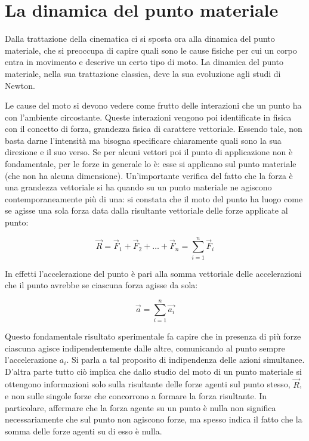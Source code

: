 \chapter{La dinamica del punto materiale}

Dalla trattazione della cinematica ci si sposta ora alla dinamica del punto materiale, che si preoccupa di capire quali sono le cause fisiche per cui un corpo entra in movimento e descrive un certo tipo di moto. La dinamica del punto materiale, nella sua trattazione classica, deve la sua evoluzione agli studi di Newton.

Le cause del moto si devono vedere come frutto delle interazioni che un punto ha con l'ambiente circostante. Queste interazioni vengono poi identificate in fisica con il concetto di forza, grandezza fisica di carattere vettoriale. Essendo tale, non basta darne l'intensità ma bisogna specificare chiaramente quali sono la sua direzione e il suo verso.  Se per alcuni vettori poi il punto di applicazione non è fondamentale,  per le forze in generale lo è: esse si applicano sul punto materiale (che non ha alcuna dimensione).
Un'importante verifica del fatto che la forza è una grandezza vettoriale si ha quando su un punto materiale ne agiscono contemporaneamente più di una: si constata che il moto del punto ha luogo come se agisse una sola forza data dalla risultante vettoriale delle forze applicate al punto:

\[
	\vec{R}=\vec{F}_1+\vec{F}_2+\dots+\vec{F}_n=\sum_{i=1}^n \vec{F}_i
\]

In effetti l'accelerazione del punto è pari alla somma vettoriale delle accelerazioni che il punto avrebbe se ciascuna forza agisse da sola:

\[
	\vec{a}=\sum_{i=1}^n \vec{a_i}
\]

Questo fondamentale risultato sperimentale fa capire che in presenza di più forze ciascuna agisce indipendentemente dalle altre, comunicando al punto sempre l'accelerazione $a_i$. Si parla a tal proposito di indipendenza delle azioni simultanee. D'altra parte tutto ciò implica che dallo studio del moto di un punto materiale si ottengono informazioni solo sulla risultante delle forze agenti sul punto stesso, $\vec{R}$, e non sulle singole forze che concorrono a formare la forza risultante. In particolare, affermare che la forza agente su un punto è nulla non significa necessariamente che sul punto non agiscono forze, ma spesso indica il fatto che la somma delle forze agenti su di esso è nulla.

